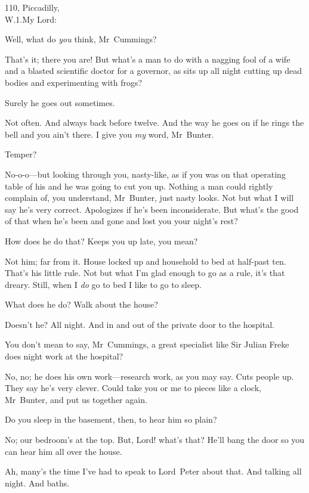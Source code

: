 \begin{mail}{110, Piccadilly,\\W\@.1.}{My Lord:}
\begin{dialogue}
 Well, what do \emph{you} think, Mr~Cummings?

 That's it; there you are! But what's a man to do with a nagging fool of a wife and a blasted scientific doctor for a governor, as sits up all night cutting up dead bodies and experimenting with frogs?

 Surely he goes out sometimes.

 Not often. And always back before twelve. And the way he goes on if he rings the bell and you ain't there. I give you \emph{my} word, Mr~Bunter.

 Temper?

 No-o-o—but looking through you, nasty-like, as if you was on that operating table of his and he was going to cut you up. Nothing a man could rightly complain of, you understand, Mr~Bunter, just nasty looks. Not but what I will say he's very correct. Apologizes if he's been inconsiderate. But what's the good of that when he's been and gone and lost you your night's rest?

 How does he do that? Keeps you up late, you mean?

 Not him; far from it. House locked up and household to bed at half-past ten. That's his little rule. Not but what I'm glad enough to go as a rule, it's that dreary. Still, when I \emph{do} go to bed I like to go to sleep.

 What does he do? Walk about the house?

 Doesn't he? All night. And in and out of the private door to the hospital.

 You don't mean to say, Mr~Cummings, a great specialist like Sir Julian Freke does night work at the hospital?

 No, no; he does his own work—research work, as you may say. Cuts people up. They say he's very clever. Could take you or me to pieces like a clock, Mr~Bunter, and put us together again.

 Do you sleep in the basement, then, to hear him so plain?

 No; our bedroom's at the top. But, Lord! what's that? He'll bang the door so you can hear him all over the house.

 Ah, many's the time I've had to speak to Lord~Peter about that. And talking all night. And baths.


\end{dialogue}
\end{mail}
